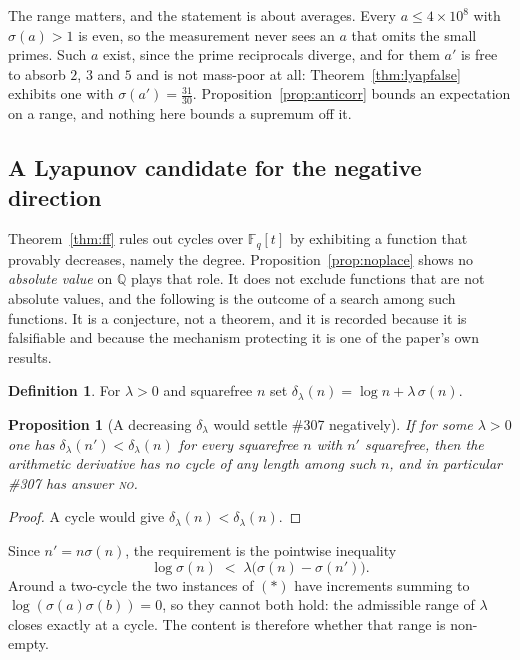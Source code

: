 \documentclass[11pt]{article}
\newtheorem{proposition}[theorem]{Proposition}
\theoremstyle{definition}
\newtheorem{definition}[theorem]{Definition}
\begin{document}
The range matters, and the statement is about averages. Every $a\le4\times10^8$ with $\sigma(a)>1$
is even, so the measurement never sees an $a$ that omits the small primes. Such $a$ exist, since the
prime reciprocals diverge, and for them $a'$ is free to absorb $2$, $3$ and $5$ and is not mass-poor
at all: Theorem~\ref{thm:lyapfalse} exhibits one with $\sigma(a')=\tfrac{31}{30}$. Proposition~\ref{prop:anticorr}
bounds an expectation on a range, and nothing here bounds a supremum off it.

\subsection*{A Lyapunov candidate for the negative direction}

Theorem~\ref{thm:ff} rules out cycles over $\mathbb{F}_q[t]$ by exhibiting a function that provably
decreases, namely the degree. Proposition~\ref{prop:noplace} shows no \emph{absolute value} on
$\mathbb{Q}$ plays that role. It does not exclude functions that are not absolute values, and the
following is the outcome of a search among such functions. It is a conjecture, not a theorem, and it
is recorded because it is falsifiable and because the mechanism protecting it is one of the paper's
own results.

\begin{definition}\label{def:lyap}
For $\lambda>0$ and squarefree $n$ set $\delta_\lambda(n)=\log n+\lambda\,\sigma(n)$.
\end{definition}

\begin{proposition}[A decreasing $\delta_\lambda$ would settle \#307 negatively]\label{prop:lyapworks}
If for some $\lambda>0$ one has $\delta_\lambda(n')<\delta_\lambda(n)$ for every squarefree $n$ with
$n'$ squarefree, then the arithmetic derivative has no cycle of any length among such $n$, and in
particular \#307 has answer \textsc{no}.
\end{proposition}
\begin{proof}
A cycle would give $\delta_\lambda(n)<\delta_\lambda(n)$.
\end{proof}

Since $n'=n\sigma(n)$, the requirement is the pointwise inequality
\[ \log\sigma(n)\;<\;\lambda\bigl(\sigma(n)-\sigma(n')\bigr). \tag{$\ast$} \]
Around a two-cycle the two instances of $(\ast)$ have increments summing to
$\log(\sigma(a)\sigma(b))=0$, so they cannot both hold: the admissible range of $\lambda$ closes
exactly at a cycle. The content is therefore whether that range is non-empty.
\end{document}
